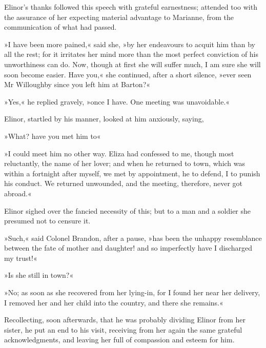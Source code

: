 Elinor’s thanks followed this speech with grateful earnestness; attended too with the assurance of her expecting material advantage to Marianne, from the communication of what had passed.

»I have been more pained,« said she, »by her endeavours to acquit him than by all the rest; for it irritates her mind more than the most perfect conviction of his unworthiness can do. Now, though at first she will suffer much, I am sure she will soon become easier. Have you,« she continued, after a short silence, »ever seen Mr Willoughby since you left him at Barton?«

»Yes,« he replied gravely, »once I have. One meeting was unavoidable.«

Elinor, startled by his manner, looked at him anxiously, saying,

»What? have you met him to\longdash«

»I could meet him no other way. Eliza had confessed to me, though most reluctantly, the name of her lover; and when he returned to town, which was within a fortnight after myself, we met by appointment, he to defend, I to punish his conduct. We returned unwounded, and the meeting, therefore, never got abroad.«

Elinor sighed over the fancied necessity of this; but to a man and a soldier she presumed not to censure it.

»Such,« said Colonel Brandon, after a pause, »has been the unhappy resemblance between the fate of mother and daughter! and so imperfectly have I discharged my trust!«

»Is she still in town?«

»No; as soon as she recovered from her lying-in, for I found her near her delivery, I removed her and her child into the country, and there she remains.«

Recollecting, soon afterwards, that he was probably dividing Elinor from her sister, he put an end to his visit, receiving from her again the same grateful acknowledgments, and leaving her full of compassion and esteem for him.